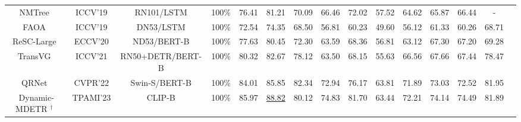 \begin{table*}[!t]
{\begin{tabular}{lllccccccccccll}
\multicolumn{1}{c|}{NMTree~\cite{liu2019learning}}   &\multicolumn{1}{c|}{ICCV'19}& \multicolumn{1}{c|}{RN101/LSTM}& \multicolumn{1}{c|}{100\%} & 76.41 & 81.21 &  \multicolumn{1}{c|}{70.09} & 66.46 & 72.02 & \multicolumn{1}{c|}{57.52} & 64.62 & 65.87 & \multicolumn{1}{c|}{66.44}  &\multicolumn{1}{c}{-} &\\ %



\multicolumn{1}{c|}{FAOA~\cite{yang2019fast}}  &\multicolumn{1}{c|}{ICCV'19} &\multicolumn{1}{c|}{DN53/LSTM}& \multicolumn{1}{c|}{100\%} & 72.54 & 74.35 &  \multicolumn{1}{c|}{68.50} & 56.81 & 60.23 & \multicolumn{1}{c|}{49.60} & 56.12 & 61.33 & \multicolumn{1}{c|}{60.26}  &\multicolumn{1}{c}{68.71} &\\

\multicolumn{1}{c|}{ReSC-Large~\cite{yang2020improving}}   &\multicolumn{1}{c|}{ECCV'20} &\multicolumn{1}{c|}{ND53/BERT-B}& \multicolumn{1}{c|}{100\%} & 77.63 & 80.45 & \multicolumn{1}{c|}{72.30} & 63.59 & 68.36 & \multicolumn{1}{c|}{56.81} & 63.12 & 67.30 & \multicolumn{1}{c|}{67.20}  &\multicolumn{1}{c}{69.28} &\\ 

\multicolumn{1}{c|}{TransVG~\cite{deng2021transvg}}   & \multicolumn{1}{c|}{ICCV'21}& \multicolumn{1}{c|}{RN50+DETR/BERT-B}& \multicolumn{1}{c|}{100\%}&  80.32 & 82.67 & \multicolumn{1}{c|}{78.12} & 63.50 & 68.15 & \multicolumn{1}{c|}{55.63} & 66.56 & 67.66 & \multicolumn{1}{c|}{67.44}  &\multicolumn{1}{c}{78.47} &\\
\multicolumn{1}{c|}{QRNet~\cite{ye2022shifting}}     & \multicolumn{1}{c|}{CVPR'22}&\multicolumn{1}{c|}{Swin-S/BERT-B}& \multicolumn{1}{c|}{100\%}   & 84.01  & 85.85  & \multicolumn{1}{c|}{82.34}  & 72.94  & 76.17  & \multicolumn{1}{c|}{63.81}  & 71.89  & 73.03  &\multicolumn{1}{c|}{72.52}  &\multicolumn{1}{c}{81.95} &\\ 


\multicolumn{1}{c|}{Dynamic-MDETR $^\dagger$~\cite{shi2023dynamic}}  & \multicolumn{1}{c|}{TPAMI’23}& \multicolumn{1}{c|}{CLIP-B}&\multicolumn{1}{c|}{100\%}  & 85.97  & \underline{88.82}  & \multicolumn{1}{c|}{80.12}  & 74.83  & 81.70  & \multicolumn{1}{c|}{63.44}  & 72.21& 74.14  & \multicolumn{1}{c|}{74.49}   & \multicolumn{1}{c}{81.89} &\\


\end{tabular}}
\end{table*}
